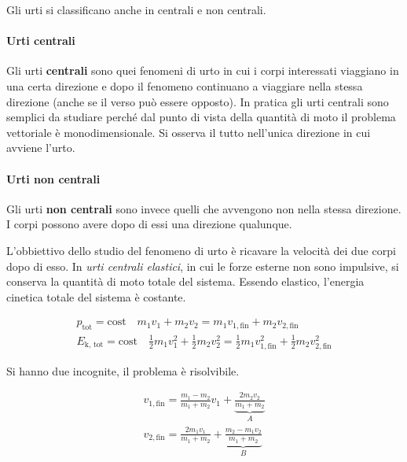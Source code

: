 Gli urti si classificano anche in centrali e non centrali.

\paragraph{Urti centrali} Gli urti \textbf{centrali} sono quei fenomeni di urto in cui i corpi interessati viaggiano in una certa direzione e dopo il fenomeno continuano a viaggiare nella stessa direzione (anche se il verso può essere opposto). In pratica gli urti centrali sono semplici da studiare perché dal punto di vista della quantità di moto il problema vettoriale è monodimensionale. Si osserva il tutto nell'unica direzione in cui avviene l'urto.

\paragraph{Urti non centrali} Gli urti \textbf{non centrali} sono invece quelli che avvengono non nella stessa direzione. I corpi possono avere dopo di essi una direzione qualunque.

L'obbiettivo dello studio del fenomeno di urto è ricavare la velocità dei due corpi dopo di esso. In \textit{urti centrali elastici}, in cui le forze esterne non sono impulsive, si conserva la quantità di moto totale del sistema. Essendo elastico, l'energia cinetica totale del sistema è costante.

\begin{gather*}
	p_\text{tot}=\text{cost} \quad m_1 v_1+m_2 v_2=m_1 v_{1,\text{fin}}+m_2 v_{2,\text{fin}} \\
	E_\text{k, tot}=\text{cost} \quad \frac{1}{2}m_1 v_1^2+\frac{1}{2}m_2 v_2^2=\frac{1}{2}m_1 v_{1,\text{fin}}^2+\frac{1}{2}m_2 v_{2,\text{fin}}^2
\end{gather*}

Si hanno due incognite, il problema è risolvibile.

\begin{gather*}
	v_{1,\text{fin}}=\frac{m_1-m_2}{m_1+m_2} v_1+\underbrace{\frac{2m_2 v_2}{m_1+m_2}}_A \\
	v_{2,\text{fin}}=\frac{2m_1 v_1}{m_1+m_2}+\underbrace{\frac{m_2-m_1 v_2}{m_1+m_2}}_B
\end{gather*}

